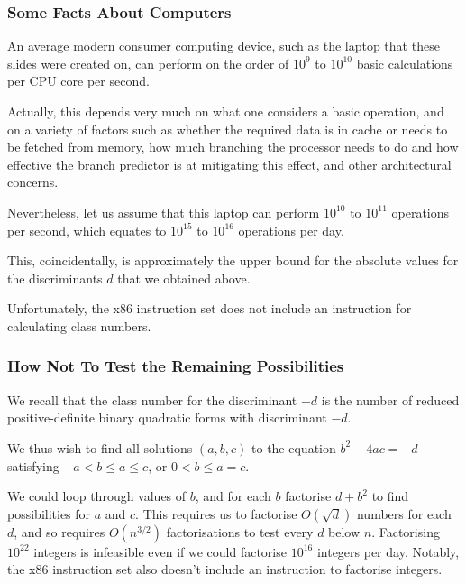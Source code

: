 \documentclass{beamer}
\begin{document}
\begin{frame}

	\frametitle{Some Facts About Computers}

	An average modern consumer computing device, such as the laptop that these slides were created on, can perform on the order of $10^9$ to $10^{10}$ basic calculations per CPU core per second. \pause

	Actually, this depends very much on what one considers a basic operation, and on a variety of factors such as whether the required data is in cache or needs to be fetched from memory, how much branching the processor needs to do and how effective the branch predictor is at mitigating this effect, and other architectural concerns. \pause

	Nevertheless, let us assume that this laptop can perform $10^{10}$ to $10^{11}$ operations per second, which equates to $10^{15}$ to $10^{16}$ operations per day. \pause

	This, coincidentally, is approximately the upper bound for the absolute values for the discriminants $d$ that we obtained above. \pause

	Unfortunately, the x86 instruction set does not include an instruction for calculating class numbers.

	
\end{frame}

\begin{frame}

	\frametitle{How Not To Test the Remaining Possibilities}

	We recall that the class number for the discriminant $-d$ is the number of reduced positive-definite binary quadratic forms with discriminant $-d$. \pause

	We thus wish to find all solutions $(a, b, c)$ to the equation $b^2 - 4ac = -d$ satisfying $-a < b \leq a \leq c$, or $0 < b \leq a = c$. \pause

	We could loop through values of $b$, and for each $b$ factorise $d + b^2$ to find possibilities for $a$ and $c$. This requires us to factorise $O(\sqrt{d})$ numbers for each $d$, and so requires $O(n^{3/2})$ factorisations to test every $d$ below $n$. Factorising $10^{22}$ integers is infeasible even if we could factorise $10^{16}$ integers per day. Notably, the x86 instruction set also doesn't include an instruction to factorise integers. \pause

\end{frame}
\end{document}
